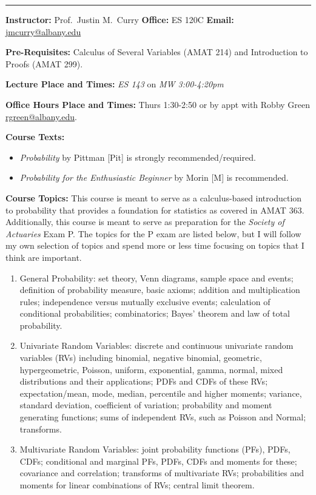 \documentclass[11pt,reqno]{amsproc}
\begin{document}
\begin{center}
	{\Large \color{Black}{AMAT 362---Probability for Statistics---Spring 2022 Syllabus}}
	\noindent\rule{\textwidth}{0.1pt}

	\textbf{Instructor:} Prof.~Justin M.~Curry \quad \textbf{Office:} ES 120C \quad \textbf{Email:} \url{jmcurry@albany.edu}
\end{center}

\noindent\textbf{Pre-Requisites:} Calculus of Several Variables (AMAT 214) and Introduction to Proofs (AMAT 299).

\noindent\textbf{Lecture Place and Times:} \emph{ES 143} on \emph{MW 3:00-4:20pm}

\noindent\textbf{Office Hours Place and Times:} Thurs 1:30-2:50 or by appt with Robby Green \url{rgreen@albany.edu}.

\noindent\textbf{Course Texts:}
\begin{itemize}
  \item \emph{Probability} by Pittman [Pit] is strongly recommended/required.
  \item \emph{Probability for the Enthusiastic Beginner} by Morin [M] is recommended.
\end{itemize}

\noindent\textbf{Course Topics:}
This course is meant to serve as a calculus-based introduction to probability that provides a foundation for statistics as covered in AMAT 363.
Additionally, this course is meant to serve as preparation for the \emph{Society of Actuaries} Exam P. The topics for the P exam are listed below, but I will follow my own selection of topics and spend more or less time focusing on topics that I think are important.

\begin{enumerate}
	\item General Probability: set theory, Venn diagrams, sample space and events; definition of probability measure, basic axioms; addition and multiplication rules; independence versus mutually exclusive events; calculation of conditional probabilities; combinatorics; Bayes' theorem and law of total probability.
	\item Univariate Random Variables: discrete and continuous univariate random variables (RVs) including binomial, negative binomial, geometric, hypergeometric, Poisson, uniform, exponential, gamma, normal, mixed distributions and their applications; PDFs and CDFs of these RVs; expectation/mean, mode, median, percentile and higher moments; variance, standard deviation, coefficient of variation; probability and moment generating functions; sums of independent RVs, such as Poisson and Normal; transforms.
	\item  Multivariate Random Variables: joint probability functions (PFs), PDFs, CDFs; conditional and marginal PFs, PDFs, CDFs and moments for these; covariance and correlation; transforms of multivariate RVs; probabilities and moments for linear combinations of RVs; central limit theorem.
\end{enumerate}
\end{document}
